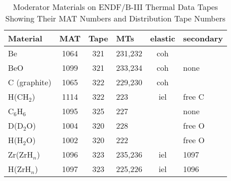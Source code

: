 \begin{table}[t]
\caption[ENDF/B-III Thermal Data Files]{Moderator Materials on
ENDF/B-III Thermal Data Tapes Showing Their MAT Numbers and
Distribution Tape Numbers}
\label{th1}
\begin{center}
\begin{tabular}{lcclcl}
   Material         &  MAT  &  Tape  &  MTs   & elastic & secondary \\
  \hline
   Be               &  1064  &  321  &  231,232  &  coh  &           \\
   BeO              &  1099  &  321  &  233,234  &  coh  &  none     \\
   C (graphite)      &  1065  &  322  &  229,230  &  coh  &           \\
   H(CH$_2$)  &  1114  &  322  &  223      &  iel  &  free C   \\
   C$_6$H$_6$       &  1095  &  325  &  227      &       &  none     \\
   D(D$_2$O)        &  1004  &  320  &  228      &       &  free O   \\
   H(H$_2$O)        &  1002  &  320  &  222      &       &  free O   \\
   Zr(ZrH$_n$)      &  1096  &  323  &  235,236  &  iel  &  1097     \\
   H(ZrH$_n$)       &  1097  &  323  &  225,226  &  iel  &  1096     \\
  \hline
\end{tabular}
\end{center}
\end{table}

